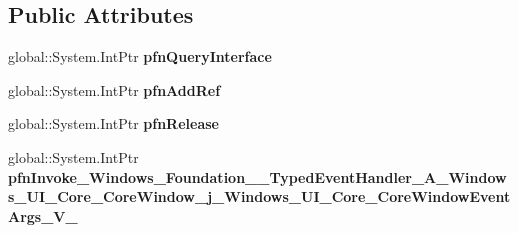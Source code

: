 \subsection*{Public Attributes}
\begin{DoxyCompactItemize}
\item 
\mbox{\label{struct_windows_1_1_foundation_1_1_typed_event_handler___a___windows___u_i___core___core_window__f96fd82f4e79c9942232efb7e426aa23_aa900978891a565959079cfd1ce591de3}} 
global\+::\+System.\+Int\+Ptr {\bfseries pfn\+Query\+Interface}
\item 
\mbox{\label{struct_windows_1_1_foundation_1_1_typed_event_handler___a___windows___u_i___core___core_window__f96fd82f4e79c9942232efb7e426aa23_a7eeb457a407e2b6964ba85bad465a81d}} 
global\+::\+System.\+Int\+Ptr {\bfseries pfn\+Add\+Ref}
\item 
\mbox{\label{struct_windows_1_1_foundation_1_1_typed_event_handler___a___windows___u_i___core___core_window__f96fd82f4e79c9942232efb7e426aa23_ac2422a2a9921e1e194fc3dac8bbc319d}} 
global\+::\+System.\+Int\+Ptr {\bfseries pfn\+Release}
\item 
\mbox{\label{struct_windows_1_1_foundation_1_1_typed_event_handler___a___windows___u_i___core___core_window__f96fd82f4e79c9942232efb7e426aa23_a610c1d3bf23aef61fc521c2a9b5f417d}} 
global\+::\+System.\+Int\+Ptr {\bfseries pfn\+Invoke\+\_\+\+Windows\+\_\+\+Foundation\+\_\+\+\_\+\+Typed\+Event\+Handler\+\_\+\+A\+\_\+\+Windows\+\_\+\+U\+I\+\_\+\+Core\+\_\+\+Core\+Window\+\_\+j\+\_\+\+Windows\+\_\+\+U\+I\+\_\+\+Core\+\_\+\+Core\+Window\+Event\+Args\+\_\+\+V\+\_\+}
\end{DoxyCompactItemize}
